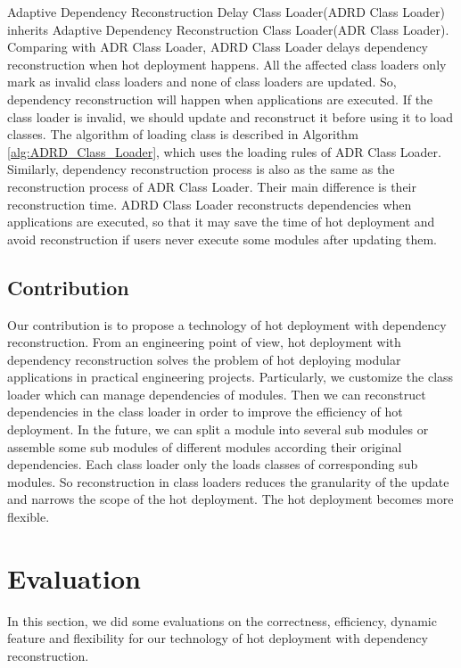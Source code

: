 \documentclass[conference]{IEEEtran}
\begin{document}
Adaptive Dependency Reconstruction Delay Class Loader(ADRD Class Loader) inherits Adaptive Dependency Reconstruction Class Loader(ADR Class Loader).
Comparing with ADR Class Loader, ADRD Class Loader delays dependency reconstruction when hot deployment happens.
All the affected class loaders only mark as invalid class loaders and none of class loaders are updated.
So, dependency reconstruction will happen when applications are executed.
If the class loader is invalid, we should update and reconstruct it before using it to load classes. 
The algorithm of loading class is described in Algorithm \ref{alg:ADRD_Class_Loader}, which uses the loading rules of ADR Class Loader.
Similarly, dependency reconstruction process is also as the same as the reconstruction process of ADR Class Loader.
Their main difference is their reconstruction time.
ADRD Class Loader reconstructs dependencies when applications are executed, so that it may save the time of hot deployment and avoid reconstruction if users never execute some modules after updating them.


\subsection{Contribution}
Our contribution is to propose a technology of hot deployment with dependency reconstruction.
From an engineering point of view, hot deployment with dependency reconstruction solves the problem of hot deploying modular applications in practical engineering projects.
Particularly, we customize the class loader which can manage dependencies of modules.
Then we can reconstruct dependencies in the class loader in order to improve the efficiency of hot deployment.
In the future, we can split a module into several sub modules or assemble some sub modules of different modules according their original dependencies.
Each class loader only the loads classes of corresponding sub modules.
So reconstruction in class loaders reduces the granularity of the update and narrows the scope of the hot deployment.
The hot deployment becomes more flexible. 




\section{Evaluation\label{sec:evaluation}}
In this section, we did some evaluations on the correctness, efficiency, dynamic feature and flexibility for our technology of hot deployment with dependency reconstruction.
\end{document}
